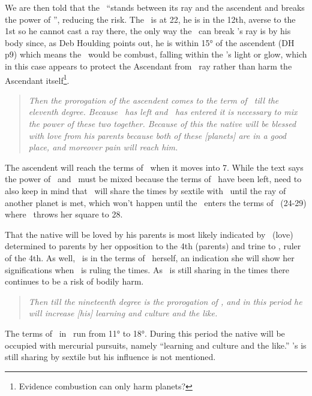 We are then told that the \Sun\, ``stands between its ray and the ascendent and breaks the power of \Mars'', reducing the risk. The \Sun\, is at 22\Libra, he is in the 12th, averse to the 1st so he cannot cast a ray there, the only way the \Sun\, can break \Mars's ray is by his body since, as Deb Houlding points out, he is within 15° of the ascendent (DH p9) which means the \ASC\, would be combust, falling within the \Sun's light or glow, which in this case appears to protect the Ascendant from \Mars\, ray rather than harm the Ascendant itself\footnote{Evidence combustion can only harm planets?}.

\begin{quote}
\textsl{Then the prorogation of the ascendent comes to the term of \Venus\, till the eleventh degree. Because \Mars\, has left and \Venus\, has entered it is necessary to mix the power of these two together. Because of this the native will be blessed with love from his parents because both of these [planets] are in a good place, and moreover pain will reach him.}
\end{quote}

The ascendent will reach the terms of \Venus\, when it moves into 7\Scorpio. While the text says the power of \Mars\, and \Venus\, must be mixed because the terms of \Mars\, have been left, need to also keep in mind that \Mars\, will share the times by sextile with \Venus\, until the ray of another planet is met, which won't happen until the \ASC\, enters the terms of \Saturn\, (24-29\Scorpio) where \Venus\, throws her square to 28\Scorpio.

That the native will be loved by his parents is most likely indicated by \Venus\, (love) determined to parents by her opposition to the 4th (parents) and trine to \Saturn, ruler of the 4th. As well, \Venus\, is in the terms of \Mars\, herself, an indication she will show her significations when \Mars\, is ruling the times. As \Mars\, is still sharing in the times there continues to be a risk of bodily harm. 

\begin{quote}
\textsl{Then till the nineteenth degree is the prorogation of \Mercury, and in this period he will increase [his] learning and culture and the like.}
\end{quote}

The terms of \Mercury\, in \Scorpio\, run from 11° to 18°. During this period the native will be occupied with mercurial pursuits, namely ``learning and culture and the like.'' \Mars's is still sharing by sextile but his influence is not mentioned.

